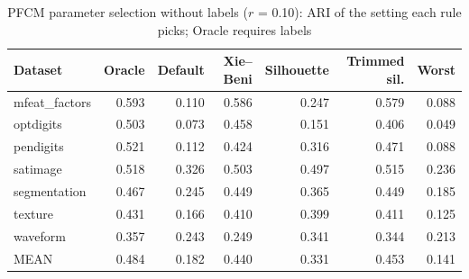 \begin{table}[t]
\centering
\scriptsize
\setlength{\tabcolsep}{3pt}
\caption{PFCM parameter selection without labels ($r$ = 0.10): ARI of the setting each rule picks; Oracle requires labels}
\label{tab:selection}
\begin{tabular}{lrrrrrr}
\toprule
Dataset & Oracle & Default & Xie--Beni & Silhouette & Trimmed sil. & Worst \\
\midrule
mfeat\_factors & 0.593 & 0.110 & 0.586 & 0.247 & 0.579 & 0.088 \\
optdigits & 0.503 & 0.073 & 0.458 & 0.151 & 0.406 & 0.049 \\
pendigits & 0.521 & 0.112 & 0.424 & 0.316 & 0.471 & 0.088 \\
satimage & 0.518 & 0.326 & 0.503 & 0.497 & 0.515 & 0.236 \\
segmentation & 0.467 & 0.245 & 0.449 & 0.365 & 0.449 & 0.185 \\
texture & 0.431 & 0.166 & 0.410 & 0.399 & 0.411 & 0.125 \\
waveform & 0.357 & 0.243 & 0.249 & 0.341 & 0.344 & 0.213 \\
MEAN & 0.484 & 0.182 & 0.440 & 0.331 & 0.453 & 0.141 \\
\bottomrule
\end{tabular}
\end{table}
